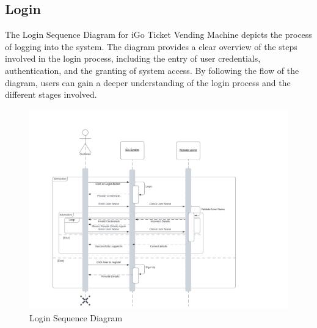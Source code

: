 \documentclass[a4paper, 11pt]{report}
\begin{document}
\subsection{Login}
The Login Sequence Diagram for iGo Ticket Vending Machine depicts the process of logging into the system. The diagram provides a clear overview of the steps involved in the login process, including the entry of user credentials, authentication, and the granting of system access. By following the flow of the diagram, users can gain a deeper understanding of the login process and the different stages involved. 
\begin{figure}[h]
    \renewcommand{\thefigure}{7.2.1}
    \centering
    \includegraphics[scale=0.7]{Login.jpeg}
    \caption{Login Sequence Diagram}
\end{figure}
\clearpage
\end{document}
